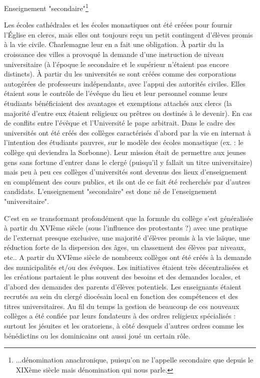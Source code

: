 Enseignement "secondaire"\footnote{...dénomination anachronique, puisqu'on ne l'appelle secondaire que depuis le XIXème siècle mais dénomination qui nous parle.} 

Les écoles cathédrales et les écoles monastiques ont été créées pour fournir l'Église en clercs, mais elles ont toujours reçu un petit contingent d'élèves promis à la vie civile. Charlemagne leur en a fait une obligation. À partir du  la croissance des villes a provoqué la demande d'une instruction de niveau universitaire (à l'époque le secondaire et le supérieur n'étaient pas encore distincts). À partir du  les universités se sont créées comme des corporations autogérées de professeurs indépendants, avec l'appui des autorités civiles. Elles étaient sous le contrôle de l'évêque du lieu et leur personnel comme leurs étudiants bénéficiaient des avantages et exemptions attachés aux clercs (la majorité d'entre eux étaient religieux ou prêtres ou destinés à le devenir). En cas de conflits entre l'évêque et l'Université le pape arbitrait. Dans le cadre des universités ont été créés des collèges caractérisés d'abord par la vie en internat à l'intention des étudiants pauvres, sur le modèle des écoles monastique (ex. : le collège qui deviendra la Sorbonne). Leur mission était de permettre aux jeunes gens sans fortune d'entrer dans le clergé (puisqu'il y fallait un titre universitaire) mais peu à peu ces collèges d'universités sont devenus des lieux d'enseignement en complément des cours publics, et ils ont de ce fait été recherchés par d'autres candidats. L'enseignement "secondaire" est donc né de l'enseignement "universitaire".

C'est en se transformant profondément que la formule du collège s'est généralisée à partir du XVIème siècle (sous l'influence des protestants ?) avec une pratique de l'externat presque exclusive, une majorité d'élèves promis à la vie laïque, une réduction forte de la dispersion des âges, un classement des élèves par niveaux, etc.. A partir du XVIème siècle de nombreux collèges ont été créés à la demande des municipalités et/ou des évêques. Les initiatives étaient très décentralisées et les créations partaient le plus souvent des besoins et des demandes locales, et d'abord des demandes des parents d'élèves potentiels. Les enseignants étaient recrutés au sein du clergé diocésain local en fonction des compétences et des titres universitaires. Au fil du temps la gestion de beaucoup de ces nouveaux collèges a été confiée par leurs fondateurs à des ordres religieux spécialisés : surtout les jésuites et les oratoriens, à côté desquels d'autres ordres comme les bénédictins ou les dominicains ont aussi joué un certain rôle. 

